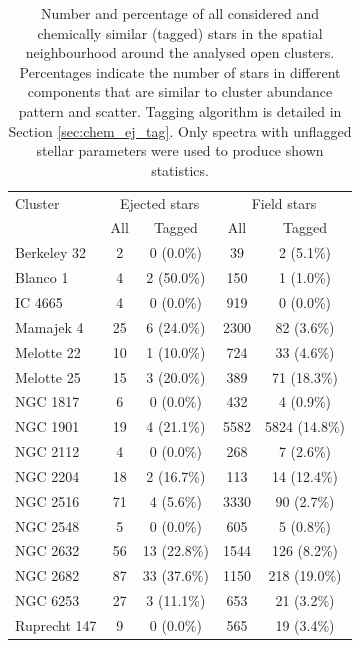 \begin{table}
	\centering
	\caption{Number and percentage of all considered and chemically similar (tagged) stars in the spatial neighbourhood around the analysed open clusters. Percentages indicate the number of stars in different components that are similar to cluster abundance pattern and scatter. Tagging algorithm is detailed in Section \ref{sec:chem_ej_tag}. Only spectra with unflagged stellar parameters were used to produce shown statistics.}
	\begin{tabular}{l c c c c }
		\hline
		Cluster & \multicolumn{2}{c}{Ejected stars}  & \multicolumn{2}{c}{Field stars} \\
		 & All & Tagged & All & Tagged \\
		\hline \hline
		Berkeley 32  & 2 & 0 (0.0\%) & 39 & 2 (5.1\%) \\ 
		Blanco 1     & 4 & 2 (50.0\%) & 150 & 1 (1.0\%) \\
		IC 4665      & 4 & 0 (0.0\%) & 919 & 0 (0.0\%) \\
		Mamajek 4    & 25 & 6 (24.0\%) & 2300 & 82 (3.6\%) \\
		Melotte 22   & 10 & 1 (10.0\%) & 724 & 33 (4.6\%) \\
		Melotte 25   & 15 & 3 (20.0\%) & 389 & 71 (18.3\%) \\
		NGC 1817     & 6 & 0 (0.0\%) & 432 & 4 (0.9\%) \\
		NGC 1901     & 19 & 4 (21.1\%) & 5582 & 5824 (14.8\%) \\
		NGC 2112     & 4 & 0 (0.0\%) & 268 & 7 (2.6\%) \\
		NGC 2204     & 18 & 2 (16.7\%) & 113 & 14 (12.4\%) \\
		NGC 2516     & 71 & 4 (5.6\%) & 3330 & 90 (2.7\%) \\
		NGC 2548     & 5 & 0 (0.0\%) & 605 & 5 (0.8\%) \\
		NGC 2632     & 56 & 13 (22.8\%) & 1544 & 126 (8.2\%) \\
		NGC 2682     & 87 & 33 (37.6\%) & 1150 & 218 (19.0\%) \\
		NGC 6253     & 27 & 3 (11.1\%) & 653 & 21 (3.2\%) \\
		Ruprecht 147 & 9 & 0 (0.0\%) & 565 & 19 (3.4\%) \\
		\hline
	\end{tabular}
	\label{tab:cluster_stats_abundtag}
\end{table}

